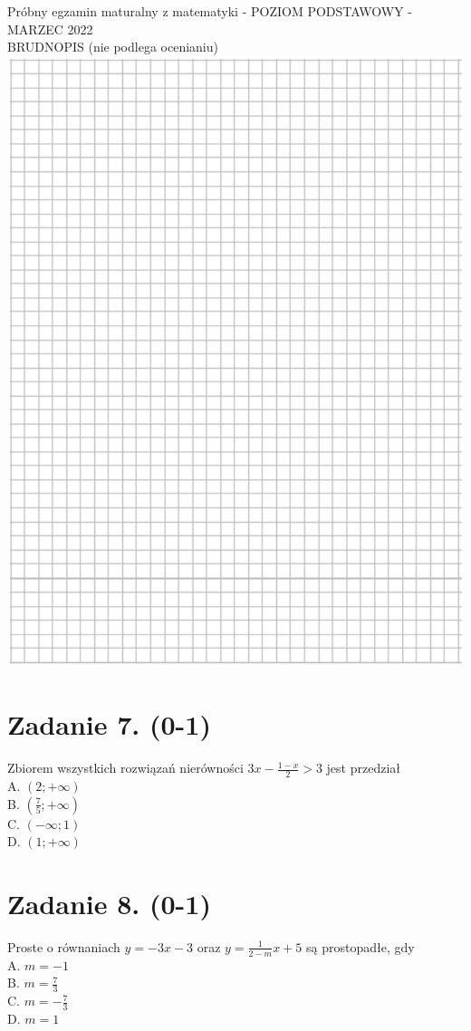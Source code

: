 \documentclass[10pt]{article}
\begin{document}
Próbny egzamin maturalny z matematyki - POZIOM PODSTAWOWY - MARZEC 2022\\
BRUDNOPIS (nie podlega ocenianiu)\\
\includegraphics[max width=\textwidth, center]{2024_11_21_fd555512e32c497e8a5dg-03}

\section*{Zadanie 7. (0-1)}
Zbiorem wszystkich rozwiązań nierówności \(3 x-\frac{1-x}{2}>3\) jest przedział\\
A. \((2 ;+\infty)\)\\
B. \(\left(\frac{7}{5} ;+\infty\right)\)\\
C. \((-\infty ; 1)\)\\
D. \((1 ;+\infty)\)

\section*{Zadanie 8. (0-1)}
Proste o równaniach \(y=-3 x-3\) oraz \(y=\frac{1}{2-m} x+5\) są prostopadłe, gdy\\
A. \(m=-1\)\\
B. \(m=\frac{7}{3}\)\\
C. \(m=-\frac{7}{3}\)\\
D. \(m=1\)
\end{document}
